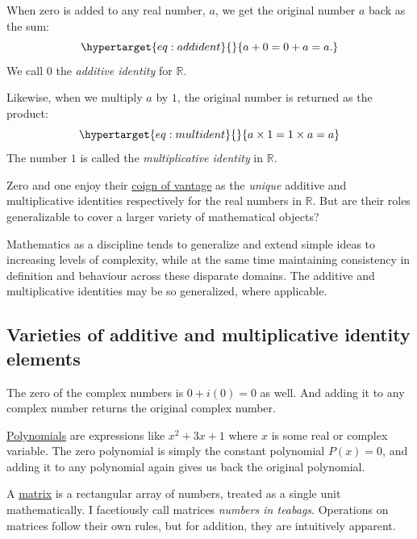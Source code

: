 \documentclass[
  a4paper,
]{article}
\begin{document}
When zero is added to any real number, \(a\), we get the original number
\(a\) back as the sum:
\begin{equation}\protect\hypertarget{eq:addident}{}{
a + 0 = 0 + a = a.
}\label{eq:addident}\end{equation} We call \(0\) the \emph{additive
identity} for \(\mathbb{R}\).

Likewise, when we multiply \(a\) by \(1\), the original number is
returned as the product:
\begin{equation}\protect\hypertarget{eq:multident}{}{
a \times 1 = 1 \times a = a
}\label{eq:multident}\end{equation} The number \(1\) is called the
\emph{multiplicative identity} in \(\mathbb{R}\).

Zero and one enjoy their
\href{https://dictionary.cambridge.org/dictionary/english/coign-of-vantage}{coign
of vantage} as the \emph{unique} additive and multiplicative identities
respectively for the real numbers in \(\mathbb{R}\). But are their roles
generalizable to cover a larger variety of mathematical objects?

Mathematics as a discipline tends to generalize and extend simple ideas
to increasing levels of complexity, while at the same time maintaining
consistency in definition and behaviour across these disparate domains.
The additive and multiplicative identities may be so generalized, where
applicable.

\hypertarget{varieties-of-additive-and-multiplicative-identity-elements}{%
\subsection{Varieties of additive and multiplicative identity
elements}\label{varieties-of-additive-and-multiplicative-identity-elements}}

The zero of the complex numbers is \(0 + i(0) = 0\) as well. And adding
it to any complex number returns the original complex number.

\href{https://mathworld.wolfram.com/Polynomial.html}{Polynomials} are
expressions like \(x^2 + 3x + 1\) where \(x\) is some real or complex
variable. The zero polynomial is simply the constant polynomial
\(P(x) = 0\), and adding it to any polynomial again gives us back the
original polynomial.

A \href{https://mathworld.wolfram.com/Matrix.html}{matrix} is a
rectangular array of numbers, treated as a single unit mathematically. I
facetiously call matrices \emph{numbers in teabags}. Operations on
matrices follow their own rules, but for addition, they are intuitively
apparent.
\end{document}
